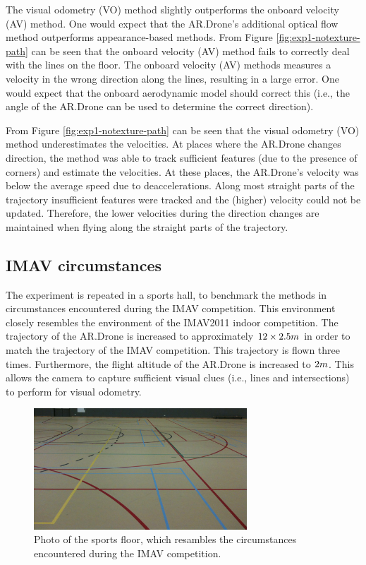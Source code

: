 The visual odometry (VO) method slightly outperforms the onboard velocity (AV) method.
One would expect that the AR.Drone's additional optical flow method outperforms appearance-based methods.
From Figure \ref{fig:exp1-notexture-path} can be seen that the onboard velocity (AV) method fails to correctly deal with the lines on the floor.
The onboard velocity (AV) methods measures a velocity in the wrong direction along the lines, resulting in a large error.
One would expect that the onboard aerodynamic model should correct this (i.e., the angle of the AR.Drone can be used to determine the correct direction).

From Figure \ref{fig:exp1-notexture-path} can be seen that the visual odometry (VO) method underestimates the velocities.
At places where the AR.Drone changes direction, the method was able to track sufficient features (due to the presence of corners) and estimate the velocities.
At these places, the AR.Drone's velocity was below the average speed due to deaccelerations.
Along most straight parts of the trajectory insufficient features were tracked and the (higher) velocity could not be updated.
Therefore, the lower velocities during the direction changes are maintained when flying along the straight parts of the trajectory.





\subsection{IMAV circumstances}
\label{sec:exp1-imav-circumstances}
The experiment is repeated in a sports hall, to benchmark the methods in circumstances encountered during the IMAV competition.
This environment closely resembles the environment of the IMAV2011 indoor competition.
The trajectory of the AR.Drone is increased to approximately $12 \times 2.5\small{m}$ in order to match the trajectory of the IMAV competition.
This  trajectory is flown three times.
Furthermore, the flight altitude of the AR.Drone is increased to $2\begin{small}m\end{small}$.
This allows the camera to capture sufficient visual clues (i.e., lines and intersections) to perform for visual odometry.

\begin{figure}[htb!]
\centering
\includegraphics[width=8cm]{images/exp1-imav-floor.jpg}
\caption{Photo of the sports floor, which resambles the circumstances encountered during the IMAV competition.}
\label{fig:exp1-floor}
\end{figure}


